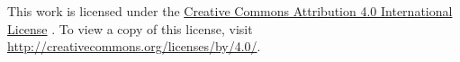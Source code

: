 \thispagestyle{empty}

\rule{0pt}{0.95\textheight}
%
\noindent This work is licensed under the
\href{https://creativecommons.org/licenses/by/4.0/}{Creative Commons Attribution
4.0 International License} \ccby. To view a copy of this license, visit
\url{http://creativecommons.org/licenses/by/4.0/}.

